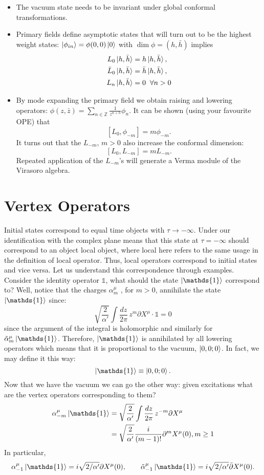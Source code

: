 \documentclass{report}
\theoremstyle{plain}
\theoremstyle{definition}
\theoremstyle{remark}
\newcommand{\FR}[2]{\frac{#1}{#2}}
\newcommand{\SFR}[2]{\sqrt{\frac{#1}{#2}}}
\newcommand{\di}{\partial}
\newcommand{\iden}{\mathds{1}}
\newcommand{\bZ}{\mathbb{Z}}
\begin{document}
\begin{itemize}
    \item The vacuum state needs to be invariant under global conformal
        transformations.
    \item Primary fields define asymptotic states that will turn out to be
        the highest weight states: $\ket{\phi_{in}} = \phi(0,0)\ket 0$ with
        $\dim \phi = (h,\bar h)$ implies
        \begin{align*}
            L_0\ket{h,\bar h} &= h \ket{h,\bar h},\\
            \bar L_0\ket{h,\bar h} &= \bar h \ket{h,\bar h},\\
            L_n\ket{h,\bar h} &= 0\;\;\forall n>0
        \end{align*}
    \item By mode expanding the primary field we obtain raising and
        lowering operators: $\phi(z,\bar z) = \sum_{n\in\bZ}
        \FR{1}{z^{n+h}} \phi_n$. It can be shown (using your favourite OPE)
        that \[ [L_0,\phi_{-m}] = m\phi_{-m}.\] It turns out that the
        $L_{-m}$, $m>0$ also increase the conformal dimension:
        \[ [L_0,L_{-m}]=mL_{-m}.\]
        Repeated application of the $L_{-m}$'s will generate a Verma module
        of the Virasoro algebra.
\end{itemize}


\section{Vertex Operators}
Initial states correspond to equal time objects with $\tau\to-\infty$.
Under our identification with the complex plane means that this state at
$\tau=-\infty$ should correspond to an object local object, where local
here refers to the same usage in the definition of local operator.
Thus, local operators correspond to initial states and vice versa. Let us
understand this correspondence through examples. Consider the identity
operator $\iden$, what should the state $\ket\iden$ correspond to?
Well, notice that the charges $\alpha^\mu_m$ , for $m>0$, annihilate the
state $\ket\iden$ since:
\[\SFR{2}{\alpha'}\int\FR{dz}{2\pi} \,z^m\di X^\mu\cdot \iden= 0\]
since the argument of the integral is holomorphic and similarly for
$\tilde\alpha^\mu_m\ket{\iden}$. Therefore, $\ket\iden$ is annihilated by
all lowering operators which means that it is proportional to the vacuum,
$\ket{0,0;0}$. In fact, we may define it this way:
\[\ket{\iden} \equiv \ket{0,0;0}.\]
Now that we have the vacuum we can go the other way: given excitations what
are the vertex operators corresponding to them?
\begin{align*}
    \alpha^\mu_{-m}\ket\iden
    &= \SFR{2}{\alpha'}\int \FR{dz}{2\pi} \, z^{-m}\di X^\mu\\
    &= \SFR{2}{\alpha'}\FR{i}{(m-1)!} \di^m X^\mu(0), m\ge 1
\end{align*}
In particular,
\[\alpha^\mu_{-1}\ket{\iden} = i\sqrt{2/\alpha'}\di X^\mu(0),\qquad
\tilde\alpha^\mu_{-1}\ket{\iden} = i\sqrt{2/\alpha'}\bar\di X^\mu(0).\]
\end{document}
